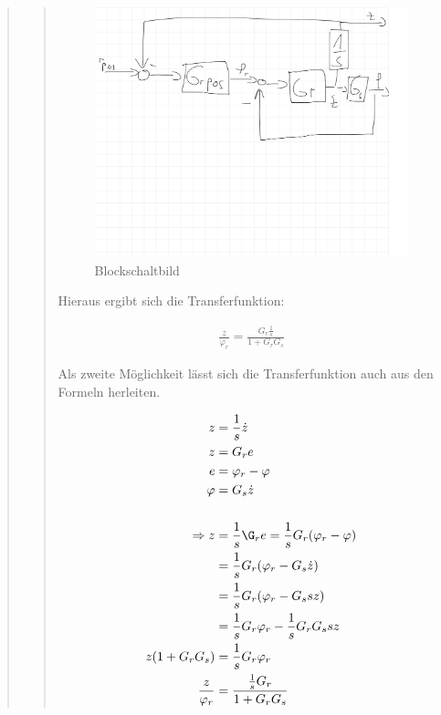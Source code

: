 \begin{quote}
\begin{quote}
        \begin{figure}[H]
        \centering
            \includegraphics[scale=0.3, trim = 0cm 12cm 0cm 0cm, clip]{./Bilder/Blockschaltbild}
                \caption{Blockschaltbild}
        \end{figure}
    
        Hieraus ergibt sich die Transferfunktion:

        \begin{equation*}
        	\begin{split}
        		\frac{z}{\varphi_r} = \frac{G_r \frac{1}{s}}{1 + G_r G_s}
        	\end{split}
        \end{equation*}
        
        Als zweite Möglichkeit lässt sich die Transferfunktion auch aus den Formeln herleiten.

        \begin{equation*}
            \begin{split}
                z &= \frac{1}{s} \dot{z}\\
                z &= G_r e\\
                e &= \varphi_r - \varphi\\
                \varphi &= G_s \dot{z}\\
                \\
                \Rightarrow z &= \frac{1}{s} \G_r e = \frac{1}{s} G_r (\varphi_r -\varphi)\\
                &= \frac{1}{s} G_r(\varphi_r - G_s \dot{z})\\
                &= \frac{1}{s} G_r(\varphi_r - G_s s z)\\
                &= \frac{1}{s} G_r \varphi_r - \frac{1}{s} G_r G_s s z\\
                z(1+G_r G_s) &= \frac{1}{s}G_r \varphi_r\\
                \frac{z}{\varphi_r} &= \frac{\frac{1}{s}G_r}{1 + G_r G_s}\\
            \end{split}
        \end{equation*}
        

\end{quote}
\end{quote}
